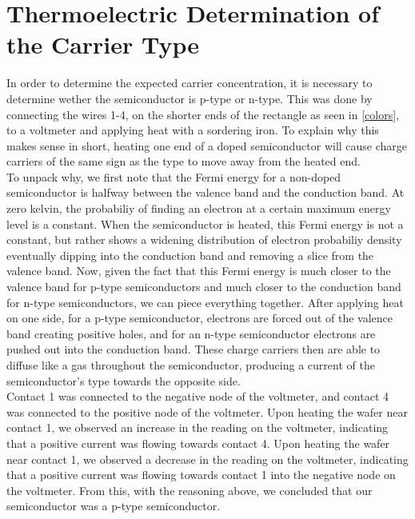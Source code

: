 \documentclass[aps,prl,reprint]{revtex4-2}
\begin{document}
\section{Thermoelectric Determination of the Carrier Type}

In order to determine the expected carrier concentration, it is necessary to determine wether
the semiconductor is p-type or n-type. This was done by connecting the wires 1-4, on the
shorter ends of the rectangle as seen in \ref{colors}, to a voltmeter and applying heat 
with a sordering iron. To explain why this makes sense in short, heating one end of a 
doped semiconductor will cause charge carriers of the same sign as the type to move away from 
the heated end. \\

To unpack why, we first note that the Fermi energy for a non-doped semiconductor is halfway
between the valence band and the conduction band. At zero kelvin, the probabiliy of finding 
an electron at a certain maximum energy level is a constant.
When the semiconductor is heated, this Fermi energy is not
a constant, but rather shows a widening distribution of electron probabiliy density eventually
dipping into the conduction band and removing a slice from the valence band. 
Now, given the fact that this Fermi energy is much closer to the valence band for p-type 
semiconductors and much closer to the conduction band for n-type semiconductors, we can
piece everything together. After applying heat on one side, for a p-type semiconductor, electrons
are forced out of the valence band creating positive holes, and for an n-type semiconductor
electrons are pushed out into the conduction band. These charge carriers then are able to
diffuse like a gas throughout the semiconductor, producing a current of the semiconductor's type
towards the opposite side. \\

Contact 1 was connected to the negative node of the voltmeter, and contact 4 was connected
to the positive node of the voltmeter. Upon heating the wafer near contact 1, we observed an
increase in the reading on the voltmeter, indicating that a positive current was flowing towards
contact 4. Upon heating the wafer near contact 1, we observed a decrease in the reading on
the voltmeter, indicating that a positive current was flowing towards contact 1 into the negative
node on the voltmeter. From this, with the reasoning above, we concluded that our semiconductor
was a p-type semiconductor. \\
\end{document}

